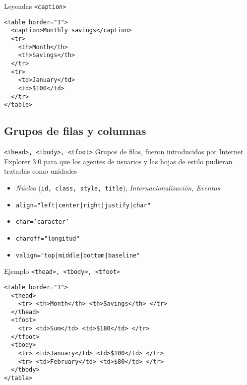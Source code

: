 \documentclass{beamer}
\begin{document}
\begin{frame}[fragile]{Leyendas \texttt{<caption>} } %
\begin{lstlisting}[]
<table border="1">
  <caption>Monthly savings</caption>
  <tr>
    <th>Month</th>
    <th>Savings</th>
  </tr>
  <tr>
    <td>January</td>
    <td>$100</td>
  </tr>
</table>    
\end{lstlisting}
\end{frame}


\subsection{Grupos de filas y columnas} %
\label{sub:Grupos de filas y columnas}

\begin{frame}{\texttt{<thead>, <tbody>, <tfoot>}} %
Grupos de filas, fueron introducidos por Internet Explorer 3.0 para que los
agentes de usuarios y las hojas de estilo pudieran tratarlas como unidades 

\begin{itemize}
    \item \textit{Núcleo} (\texttt{id, class, style, title}),
    \textit{Internacionalización, Eventos}
    \item \texttt{align="left|center|right|justify|char"}
    \item \texttt{char='caracter'}
    \item \texttt{charoff="longitud"}
    \item \texttt{valign="top|middle|bottom|baseline"}
\end{itemize}
    
\end{frame}

\begin{frame}[fragile]{Ejemplo \texttt{<thead>, <tbody>, <tfoot>}} %
\begin{lstlisting}
<table border="1">
  <thead>
    <tr> <th>Month</th> <th>Savings</th> </tr>
  </thead>
  <tfoot>
    <tr> <td>Sum</td> <td>$180</td> </tr>
  </tfoot>
  <tbody>
    <tr> <td>January</td> <td>$100</td> </tr>
    <tr> <td>February</td> <td>$80</td> </tr>
  </tbody>
</table>
\end{lstlisting}
\end{frame}
\end{document}
